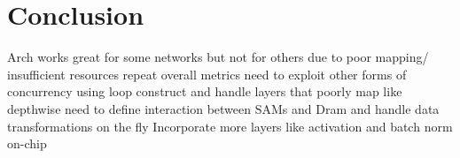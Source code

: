 \chapter{Conclusion}
\label{chap:conclude}

Arch works great for some networks but not for others due to poor mapping/ insufficient resources
repeat overall metrics
need to exploit other forms of concurrency using loop construct and handle layers that poorly map like depthwise
need to define interaction between SAMs and Dram and handle data transformations on the fly
Incorporate more layers like activation and batch norm on-chip